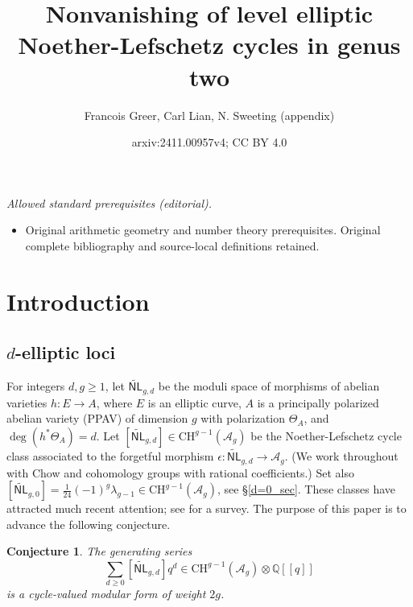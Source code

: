 \documentclass[12pt]{amsart}
\title{Nonvanishing of level elliptic Noether-Lefschetz cycles in genus two}
\author{Francois Greer, Carl Lian, N. Sweeting (appendix)}
\date{arxiv:2411.00957v4; CC BY 4.0}
\def\cA{\mathcal{A}}
\def\bQ{\mathbb{Q}}
\newcommand{\CH}{\mathrm{CH}}
\newcommand{\wNL}{{\widetilde{\mathsf{NL}}}}
\newtheorem{conj}{Conjecture}
\theoremstyle{definition}
\begin{document}
\maketitle
\noindent\textit{Allowed standard prerequisites (editorial).}\begin{itemize}
\item Original arithmetic geometry and number theory prerequisites. Original complete bibliography and source-local definitions retained.
\end{itemize}\medskip
\section{Introduction}

\subsection{$d$-elliptic loci}

For integers $d,g\ge1$, let $\wNL_{g,d}$ be the moduli space of morphisms of abelian varieties $h:E\to A$, where $E$ is an elliptic curve, $A$ is a principally polarized abelian variety (PPAV) of dimension $g$ with polarization $\Theta_A$, and $\deg(h^{*}\Theta_A)=d$. Let $[\wNL_{g,d}]\in \CH^{g-1}(\cA_g)$ be the Noether-Lefschetz cycle class associated to the forgetful morphism $\epsilon:\wNL_{g,d}\to \cA_g$. (We work throughout with Chow and cohomology groups with rational coefficients.) Set also $[\wNL_{g,0}]=\frac{1}{24}(-1)^g\lambda_{g-1}\in \CH^{g-1}(\cA_g)$, see \S\ref{d=0_sec}. These classes have attracted much recent attention; see \cite{pand_notes_24} for a survey. The purpose of this paper is to advance the following conjecture.

\begin{conj}\label{conj_ag}
    The generating series
    \begin{equation*}
        \sum_{d\ge 0}[\wNL_{g,d}]q^d \in  \CH^{g-1}(\cA_g)\otimes \bQ[[q]]
    \end{equation*}
    is a cycle-valued modular form of weight $2g$.
\end{conj}
\end{document}
